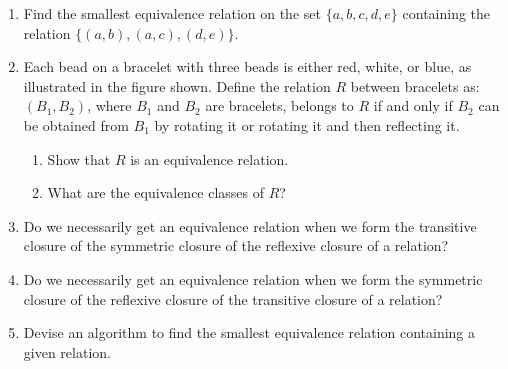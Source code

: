 \documentclass{../../cls/sig-alternate-05-2015}
\begin{document}
\begin{enumerate}
\item Find the smallest equivalence relation on the set
$\{a, b, c, d, e\}$ containing the relation $\{(a, b), (a, c),
	(d, e)\}$.

\item Each bead on a bracelet with three beads is either red,
white, or blue, as illustrated in the figure shown.
Define the relation $R$ between bracelets as: $(B_1,B_2)$,
where $B_1$ and $B_2$ are bracelets, belongs to $R$ if and only
if $B_2$ can be obtained from $B_1$ by rotating it or rotating it
and then reflecting it.
\begin{enumerate}
	\item Show that $R$ is an equivalence relation.
	\item What are the equivalence classes of $R$?
\end{enumerate}

\item Do we necessarily get an equivalence relation when we
form the transitive closure of the symmetric closure of
the reflexive closure of a relation?

\item Do we necessarily get an equivalence relation when we
form the symmetric closure of the reflexive closure of the
transitive closure of a relation?

\item Devise an algorithm to find the smallest equivalence relation
containing a given relation.

\end{enumerate}
\end{document}
